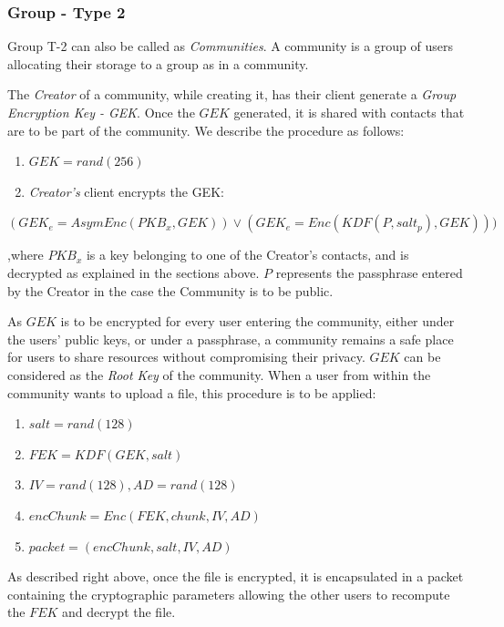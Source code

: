 \documentclass[a4paper,9pt,twoside]{article}
\begin{document}
\subsubsection{Group - Type 2}

    Group T-2 can also be called as \emph{Communities}. A community is a group 
of users allocating their storage to a group as in a community.

    The \emph{Creator} of a community, while creating it, has their client generate 
a \emph{Group Encryption Key - GEK}. Once the $GEK$ generated, it is shared 
with contacts that are to be part of the community. We describe the procedure as follows:

\begin{enumerate}
\itemsep0em
\item $GEK=rand(256)$
\item \emph{Creator's} client encrypts the GEK:
\end{enumerate}
\begin{center}
$(GEK_e=AsymEnc(PKB_x, GEK)) \lor (GEK_e=Enc(KDF(P, salt_p), GEK)))$
\end{center}

,where $PKB_x$ is a key belonging to one of the Creator's contacts, 
and is decrypted as explained in the sections above. $P$ represents the passphrase 
entered by the Creator in the case the Community is to be public.

As $GEK$ is to be encrypted for every user entering the community, either under 
the users' public keys, or under a passphrase, a community remains a safe 
place for users to share resources without compromising their privacy. $GEK$ 
can be considered as the \emph{Root Key} of the community. When a user from within 
the community wants to upload a file, this procedure     is to be applied:

\begin{enumerate}
\itemsep0em
\item $salt=rand(128)$
\item $FEK=KDF(GEK, salt)$
\item $IV=rand(128), AD=rand(128)$
\item $encChunk=Enc(FEK, chunk, IV, AD)$
\item $packet=(encChunk, salt, IV, AD)$
\end{enumerate}

As described right above, once the file is encrypted, it is encapsulated in a packet 
containing the cryptographic parameters allowing the other users to recompute the 
$FEK$ and decrypt the file.
\end{document}
